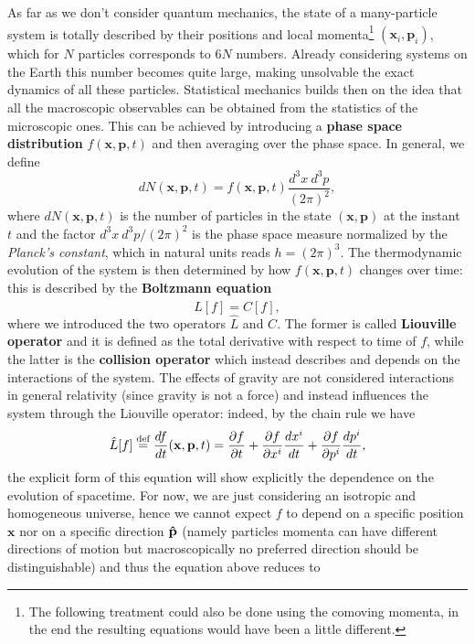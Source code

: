 As far as we don't consider quantum mechanics, the state of a many-particle system is totally described by their positions and local momenta\footnote[2]{The following treatment could also be done using the comoving momenta, in the end the resulting equations would have been a little different.} $(\mathbf x_i,\mathbf p_i)$, which for $N$ particles corresponds to $6N$ numbers. Already considering systems on the Earth this number becomes quite large, making unsolvable the exact dynamics of all these particles. Statistical mechanics builds then on the idea that all the macroscopic observables can be obtained from the statistics of the microscopic ones. This can be achieved by introducing a \textbf{phase space distribution} $f(\mathbf x,\mathbf p, t)$ and then averaging over the phase space. In general, we define
\begin{equation}
    \label{eq:phspace_dist}
    dN(\mathbf x,\mathbf p, t)=f(\mathbf x,\mathbf p, t) \frac{d^3x\ d^3p}{(2\pi)^2},
\end{equation}
where $dN(\mathbf x,\mathbf p, t)$ is the number of particles in the state $(\mathbf x,\mathbf p)$ at the instant $t$ and the factor $d^3x\ d^3p/(2\pi)^2$ is the phase space measure normalized by the \emph{Planck's constant}, which in natural units reads $h=(2\pi)^{3}$. The thermodynamic evolution of the system is then determined by how $f(\mathbf x,\mathbf p, t)$ changes over time: this is described by the \textbf{Boltzmann equation}
\begin{equation}
    \label{eq:Boltzmann}
    \hat{L}[f]=C[f],
\end{equation}
where we introduced the two operators $\hat{L}$ and $C$. The former is called \textbf{Liouville operator} and it is defined as the total derivative with respect to time of $f$, while the latter is the \textbf{collision operator} which instead describes and depends on the interactions of the system. The effects of gravity are not considered interactions in general relativity (since gravity is not a force) and instead influences the system through the Liouville operator: indeed, by the chain rule we have 
$$ 
\hat{L}[f]\stackrel{\text{def}}{=}\frac{df}{dt}(\mathbf x,\mathbf p, t)= \frac{\partial f}{\partial t}+\frac{\partial f}{\partial x^i}\frac{dx^i}{dt}+\frac{\partial f}{\partial p^i}\frac{dp^i}{dt},
$$ 
the explicit form of this equation will show explicitly the dependence on the evolution of spacetime. For now, we are just considering an isotropic and homogeneous universe, hence we cannot expect $f$ to depend on a specific position $\mathbf{x}$ nor on a specific direction $\mathbf{\hat{p}}$ (namely particles momenta can have different directions of motion but macroscopically no preferred direction should be distinguishable) and thus the equation above reduces to 
